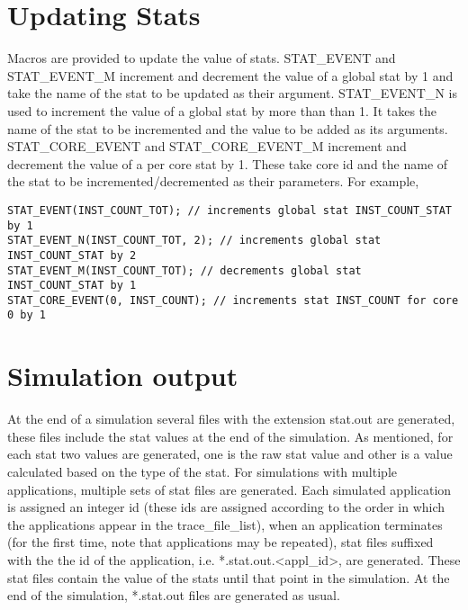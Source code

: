 \section{Updating Stats}


Macros are provided to update the value of stats. STAT\_EVENT and
STAT\_EVENT\_M increment and decrement the value of a global stat by 1 and take
the name of the stat to be updated as their argument.  STAT\_EVENT\_N is used
to increment the value of a global stat by more than than 1. It takes the name
of the stat to be incremented and the value to be added as its arguments.
STAT\_CORE\_EVENT and STAT\_CORE\_EVENT\_M increment and decrement the value of
a per core stat by 1. These take core id and the name of the stat to be
incremented/decremented as their parameters. For example,

\begin{Verbatim}
STAT_EVENT(INST_COUNT_TOT); // increments global stat INST_COUNT_STAT by 1
STAT_EVENT_N(INST_COUNT_TOT, 2); // increments global stat INST_COUNT_STAT by 2
STAT_EVENT_M(INST_COUNT_TOT); // decrements global stat INST_COUNT_STAT by 1
STAT_CORE_EVENT(0, INST_COUNT); // increments stat INST_COUNT for core 0 by 1
\end{Verbatim}



\section{Simulation output}

At the end of a simulation several files with the extension stat.out are
generated, these files include the stat values at the end of the
simulation. As mentioned, for each stat two values are generated, one is the
raw stat value and other is a value calculated based on the type of the
stat. For simulations with multiple applications, multiple sets of stat files
are generated. Each simulated application is assigned an integer id (these ids
    are assigned according to the order in which the applications appear in the
    trace\_file\_list), when an application terminates (for the first time,
      note that applications may be repeated), stat files suffixed with the the
    id of the application, i.e.  *.stat.out.<appl\_id>, are generated. These
    stat files contain the value of the stats until that point in the
    simulation. At the end of the simulation, *.stat.out files are generated as
    usual.



